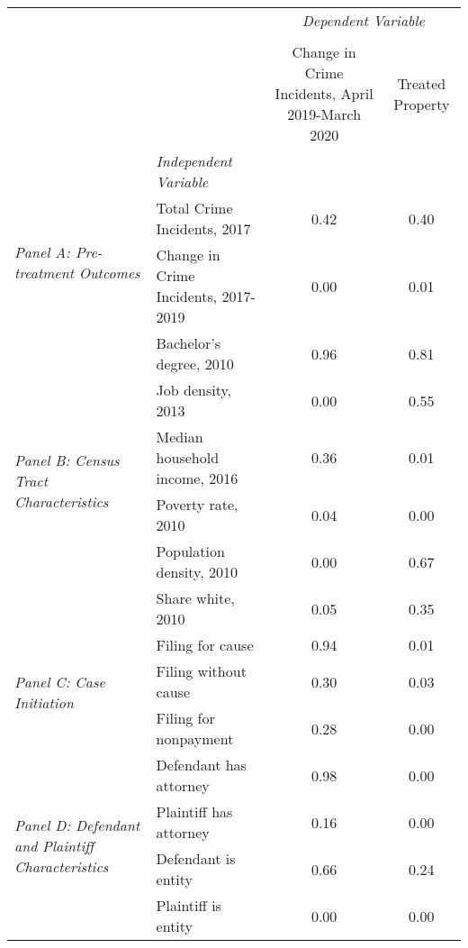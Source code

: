 \begin{tabular}{llcc}
\toprule
 &  & \multicolumn{2}{c}{\textit{Dependent Variable}} \\
\cline{3-4}
\\
 &  & Change in Crime Incidents, April 2019-March 2020 & Treated Property \\
 & \emph{Independent Variable} &  &  \\
\midrule
\multirow[c]{2}{3cm}{\textit{Panel A: Pre-treatment Outcomes}} & Total Crime Incidents, 2017 & 0.42 & 0.40 \\
 & Change in Crime Incidents, 2017-2019 & 0.00 & 0.01 \\
\cline{1-4}
\multirow[c]{6}{3cm}{\textit{Panel B: Census Tract Characteristics}} & Bachelor's degree, 2010 & 0.96 & 0.81 \\
 & Job density, 2013 & 0.00 & 0.55 \\
 & Median household income, 2016 & 0.36 & 0.01 \\
 & Poverty rate, 2010 & 0.04 & 0.00 \\
 & Population density, 2010 & 0.00 & 0.67 \\
 & Share white, 2010 & 0.05 & 0.35 \\
\cline{1-4}
\multirow[c]{3}{3cm}{\textit{Panel C: Case Initiation}} & Filing for cause & 0.94 & 0.01 \\
 & Filing without cause & 0.30 & 0.03 \\
 & Filing for nonpayment & 0.28 & 0.00 \\
\cline{1-4}
\multirow[c]{4}{3cm}{\textit{Panel D: Defendant and Plaintiff Characteristics}} & Defendant has attorney & 0.98 & 0.00 \\
 & Plaintiff has attorney & 0.16 & 0.00 \\
 & Defendant is entity & 0.66 & 0.24 \\
 & Plaintiff is entity & 0.00 & 0.00 \\
\cline{1-4}
\bottomrule
\end{tabular}
